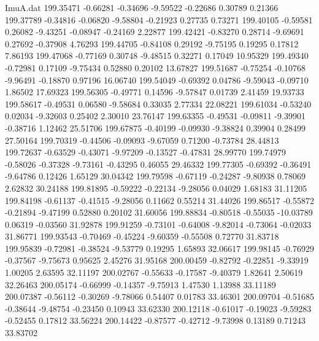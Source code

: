 \begin{filecontents}{ImuA.dat}
 199.35471   -0.66281   -0.34696   -9.59522   -0.22686    0.30789    0.21366
 199.37789   -0.34816   -0.06820   -9.58804   -0.21923    0.27735    0.73271
 199.40105   -0.59581    0.26082   -9.43251   -0.08947   -0.24169    2.22877
 199.42421   -0.83270    0.28714   -9.69691    0.27692   -0.37908    4.76293
 199.44705   -0.84108    0.29192   -9.75195    0.19295    0.17812    7.86193
 199.47068   -0.77169    0.30748   -9.48515    0.32271    0.17049   10.95329
 199.49340   -0.72981    0.17109   -9.75434    0.52880    0.20102   13.67827
 199.51687   -0.75254   -0.10768   -9.96491   -0.18870    0.97196   16.06740
 199.54049   -0.69392    0.04786   -9.59043   -0.09710    1.86502   17.69323
 199.56305   -0.49771    0.14596   -9.57847    0.01739    2.41459   19.93733
 199.58617   -0.49531    0.06580   -9.58684    0.33035    2.77334   22.08221
 199.61034   -0.53240    0.02034   -9.32603    0.25402    2.30010   23.76147
 199.63355   -0.49531   -0.09811   -9.39901   -0.38716    1.12462   25.51706
 199.67875   -0.40199   -0.09930   -9.38824    0.39904    0.28499   27.50164
 199.70319   -0.44506   -0.09093   -9.67059    0.71200   -0.73784   28.44813
 199.72637   -0.63529   -0.43071   -9.97209   -0.13527   -0.47831   28.99770
 199.74979   -0.58026   -0.37328   -9.73161   -0.43295    0.46055   29.46332
 199.77305   -0.69392   -0.36491   -9.64786    0.12426    1.65129   30.04342
 199.79598   -0.67119   -0.24287   -9.80938    0.78069    2.62832   30.24188
 199.81895   -0.59222   -0.22134   -9.28056    0.04029    1.68183   31.11205
 199.84198   -0.61137   -0.41515   -9.28056    0.11662    0.55214   31.44026
 199.86517   -0.55872   -0.21894   -9.47199    0.52880    0.20102   31.60056
 199.88834   -0.80518   -0.55035  -10.03789    0.06319   -0.03560   31.92878
 199.91259   -0.73101   -0.64008   -9.82014   -0.73064   -0.02033   31.86771
 199.93543   -0.70469   -0.45224   -9.60359   -0.55508    0.72770   31.83718
 199.95839   -0.72981   -0.38524   -9.53779    0.19295    1.65893   32.06617
 199.98145   -0.76929   -0.37567   -9.75673    0.95625    2.45276   31.95168
 200.00459   -0.82792   -0.22851   -9.33919    1.00205    2.63595   32.11197
 200.02767   -0.55633   -0.17587   -9.40379    1.82641    2.50619   32.26463
 200.05174   -0.66999   -0.14357   -9.75913    1.47530    1.13988   33.11189
 200.07387   -0.56112   -0.30269   -9.78066    0.54407    0.01783   33.46301
 200.09704   -0.51685   -0.38644   -9.48754   -0.23450    0.10943   33.62330
 200.12118   -0.61017   -0.19023   -9.59283   -0.52455    0.17812   33.56224
 200.14422   -0.87577   -0.42712   -9.73998    0.13189    0.71243   33.83702

\end{filecontents}
